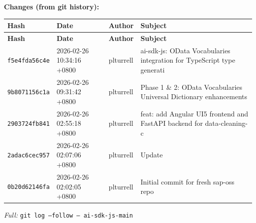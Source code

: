 \documentclass[11pt]{article}
\begin{document}
\textbf{Changes (from git history):}
\begin{longtable}{|p{2.2cm}|p{3.2cm}|l|p{6cm}|}
\hline \textbf{Hash} & \textbf{Date} & \textbf{Author} & \textbf{Subject} \\ \hline \endfirsthead
\hline \textbf{Hash} & \textbf{Date} & \textbf{Author} & \textbf{Subject} \\ \hline \endhead
\texttt{f5e4fda56c4e} & 2026-02-26 10:34:16 +0800 & plturrell & ai-sdk-js: OData Vocabularies integration for TypeScript type generati \\
\texttt{9b8071156c1a} & 2026-02-26 09:31:42 +0800 & plturrell & Phase 1 \& 2: OData Vocabularies Universal Dictionary enhancements \\
\texttt{2903724fb841} & 2026-02-26 02:55:18 +0800 & plturrell & feat: add Angular UI5 frontend and FastAPI backend for data-cleaning-c \\
\texttt{2adac6cec957} & 2026-02-26 02:07:06 +0800 & plturrell & Update \\
\texttt{0b20d62146fa} & 2026-02-26 02:02:05 +0800 & plturrell & Initial commit for fresh sap-oss repo \\
\hline
\end{longtable}
\textit{Full:} \texttt{git log --follow -- ai-sdk-js-main}
\end{document}
